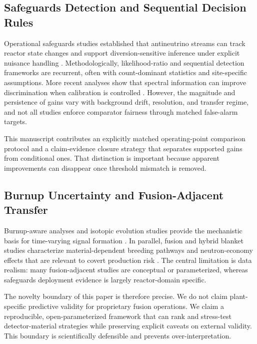 \documentclass{article} %
\begin{document}
\subsection{Safeguards Detection and Sequential Decision Rules}
Operational safeguards studies established that antineutrino streams can track reactor state changes and support diversion-sensitive inference under explicit nuisance handling \citep{SRC035,SRC034,SRC023,SRC022,SRC018,SRC017,SRC011,SRC009,SRC001}. Methodologically, likelihood-ratio and sequential detection frameworks are recurrent, often with count-dominant statistics and site-specific assumptions. More recent analyses show that spectral information can improve discrimination when calibration is controlled \citep{SRC009,SRC017,SRC023}. However, the magnitude and persistence of gains vary with background drift, resolution, and transfer regime, and not all studies enforce comparator fairness through matched false-alarm targets.

This manuscript contributes an explicitly matched operating-point comparison protocol and a claim-evidence closure strategy that separates supported gains from conditional ones. That distinction is important because apparent improvements can disappear once threshold mismatch is removed.

\subsection{Burnup Uncertainty and Fusion-Adjacent Transfer}
Burnup-aware analyses and isotopic evolution studies provide the mechanistic basis for time-varying signal formation \citep{SRC006,SRC008,SRC014,SRC015,SRC021,SRC027,SRC001}. In parallel, fusion and hybrid blanket studies characterize material-dependent breeding pathways and neutron-economy effects that are relevant to covert production risk \citep{SRC007,SRC010,SRC019,SRC025,SRC026,SRC028,SRC033,SRC036}. The central limitation is data realism: many fusion-adjacent studies are conceptual or parameterized, whereas safeguards deployment evidence is largely reactor-domain specific.

The novelty boundary of this paper is therefore precise. We do not claim plant-specific predictive validity for proprietary fusion operations. We claim a reproducible, open-parameterized framework that can rank and stress-test detector-material strategies while preserving explicit caveats on external validity. This boundary is scientifically defensible and prevents over-interpretation.
\end{document}
